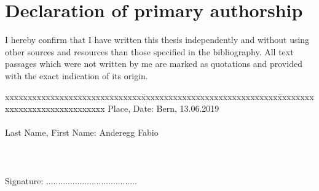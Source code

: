 \chapter*{Declaration of primary authorship}
\label{chap:declaration_authorship}

\vspace*{10mm} 

I hereby confirm that I have written this thesis independently and without using other sources and resources than those specified in the bibliography. All text passages which were not written by me are marked as quotations and provided with the exact indication of its origin.

\vspace{15mm}

\begin{tabbing}
xxxxxxxxxxxxxxxxxxxxxxxxxxxxxx\=xxxxxxxxxxxxxxxxxxxxxxxxxxxxxx\=xxxxxxxxxxxxxxxxxxxxxxxxxxxxxx\kill
Place, Date:		\> Bern, 13.06.2019 \\ \\ 
Last Name, First Name:	\> Anderegg Fabio	\\ \\ \\ \\ 
Signature:	\> ...................................... \\
\end{tabbing}
